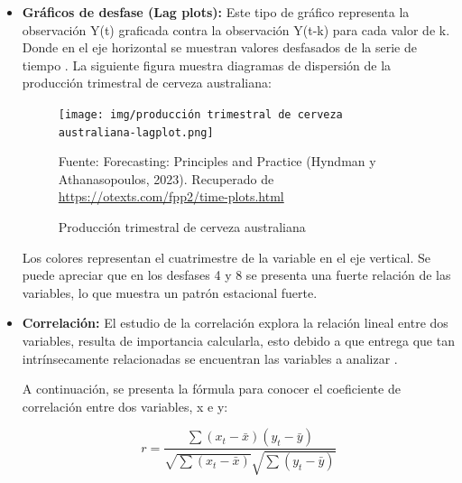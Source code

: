 \begin{itemize}
    \item \textbf{Gráficos de desfase (Lag plots):} Este tipo de gráfico representa la observación Y(t) graficada contra la observación Y(t-k) para cada valor de k. Donde en el eje horizontal se muestran valores desfasados de la serie de tiempo \cite{forecast-time-series-arima}. La siguiente figura muestra diagramas de dispersión de la producción trimestral de cerveza australiana:
    
    \begin{figure}[H]
        \begin{minipage}[t]{0.9\textwidth}
            \caption{Producción trimestral de cerveza australiana}
            \label{lagplot}        
        \end{minipage}
    
        \vspace{10pt}
    
        \begin{minipage}[b]{0.9\textwidth}
            \centering
            \texttt{[image: img/producción trimestral de cerveza australiana-lagplot.png]}        
        \end{minipage}
    
        \begin{minipage}[t]{0.9\textwidth}
            Fuente: Forecasting: Principles and Practice (Hyndman y Athanasopoulos, 2023). Recuperado de \url{https://otexts.com/fpp2/time-plots.html}
        \end{minipage}
    \end{figure}
    
    Los colores representan el cuatrimestre de la variable en el eje vertical. Se puede apreciar que en los desfases 4 y 8 se presenta una fuerte relación de las variables, lo que muestra un patrón estacional fuerte. 

    \item \textbf{Correlación:} El estudio de la correlación explora la relación lineal entre dos variables, resulta de importancia calcularla, esto debido a que entrega que tan intrínsecamente relacionadas se encuentran las variables a analizar \cite{forecast-time-series-arima}. 
    
    A continuación, se presenta la fórmula para conocer el coeficiente de correlación entre dos variables, x e y:

    \begin{equation*}
        r = \frac{\sum{(x_t - \bar{x})(y_t - \bar{y})}}{{\sqrt{\sum{(x_t - \bar{x})}}\sqrt{\sum{(y_t - \bar{y})}}}}
    \end{equation*}    
    

\end{itemize}
